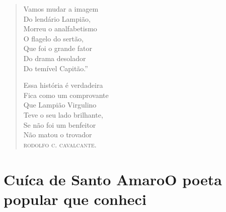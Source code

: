 \begin{verse}
Vamos mudar a imagem \\
Do lendário Lampião, \\
Morreu o analfabetismo \\
O flagelo do sertão, \\
Que foi o grande fator \\
Do drama desolador \\
Do temível Capitão.'' 


Essa história é verdadeira \\
Fica como um comprovante \\
Que Lampião Virgulino \\
Teve o seu lado brilhante, \\
Se não foi um benfeitor \\
Não matou o trovador \\
\textsc{rodolfo c. cavalcante}. 
\end{verse}

\chapter[Cuíca de Santo Amaro\\ O poeta popular que conheci]{Cuíca de Santo Amaro\break O poeta popular que conheci}

